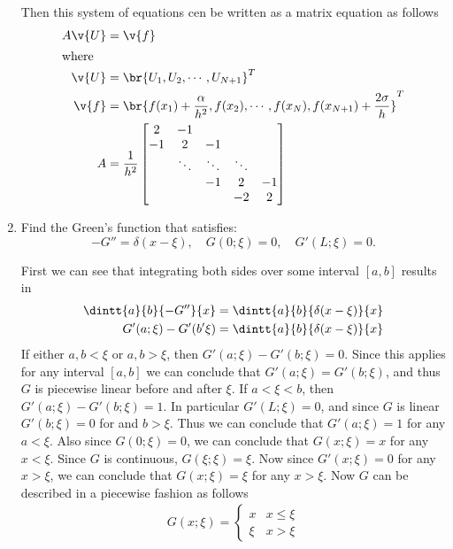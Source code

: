 \documentclass[11pt, oneside, titlepage]{article}
\begin{document}
\begin{enumerate}
        Then this system of equations cen be written as a matrix equation as follows
        \begin{align*}
            A\v{U} &= \v{f} \\
            \intertext{where}
            \v{U} &= \br{U_1, U_2, \cdots, U_{N+1}}^T \\
            \v{f} &= \br{f(x_1) + \frac{\alpha}{h^2}, f(x_2), \cdots, f(x_N), f(x_{N+1}) + \frac{2\sigma}{h}}^T \\
            A &= \frac{1}{h^2}
            \begin{bmatrix}
                 2 & -1     &        &        &    \\
                -1 &  2     & -1     &        &    \\
                   & \ddots & \ddots & \ddots &    \\
                   &        &     -1 &      2 & -1 \\
                   &        &        &     -2 &  2 \\
            \end{bmatrix}
        \end{align*}

    \item %
        Find the Green's function that satisfies:
        \[
            -G'' = \delta(x - \xi),\quad G(0;\xi) = 0,\quad G'(L;\xi) = 0.
        \]

        First we can see that integrating both sides over some interval $[a, b]$
        results in
        \begin{align*}
            \dintt{a}{b}{-G''}{x} &= \dintt{a}{b}{\delta(x - \xi)}{x} \\
            G'(a; \xi) - G'(b' \xi) &= \dintt{a}{b}{\delta(x - \xi)}{x}
        \end{align*}
        If either $a, b < \xi$ or $a, b > \xi$, then
        $G'(a; \xi) - G'(b; \xi) = 0$.
        Since this applies for any interval $[a, b]$ we can conclude that
        $G'(a; \xi) = G'(b; \xi)$, and thus $G$ is piecewise linear before and
        after $\xi$.
        If $a < \xi < b$, then $G'(a; \xi) - G'(b; \xi) = 1$.
        In particular $G'(L;\xi) = 0$, and since $G$ is linear $G'(b;\xi) = 0$
        for and $b > \xi$.
        Thus we can conclude that $G'(a; \xi) = 1$ for any $a < \xi$.
        Also since $G(0;\xi) = 0$, we can conclude that $G(x;\xi) = x$ for
        any $x < \xi$.
        Since $G$ is continuous, $G(\xi; \xi) = \xi$.
        Now since $G'(x; \xi) = 0$ for any $x > \xi$, we can conclude that
        $G(x;\xi) = \xi$ for any $x > \xi$.
        Now $G$ can be described in a piecewise fashion as follows
        \begin{align*}
            G(x; \xi) =
            \begin{cases}
                x & x \le \xi \\
                \xi & x > \xi
            \end{cases}
        \end{align*}


\end{enumerate}
\end{document}
